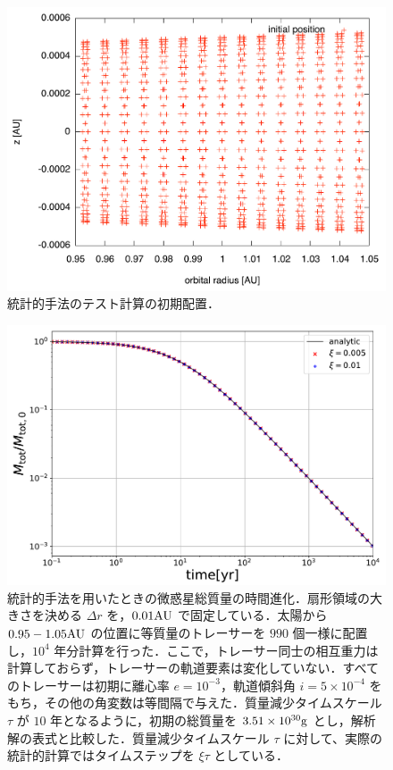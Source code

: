 \documentclass[11pt,a4paper,oneside,onecolumn]{jreport}
\begin{document}
\begin{figure}[H]
 \centering
 \includegraphics[width=12cm]{./image/initial_position_rz.pdf}
 \caption{統計的手法のテスト計算の初期配置．\label{}}
\end{figure}





\begin{figure}[H]
 \centering
 \includegraphics[width=12cm]{./image/MassDepletion.pdf}
 \caption{統計的手法を用いたときの微惑星総質量の時間進化．扇形領域の大きさを決める $\Delta r$ を，$0.01 {\rm AU}$ で固定している．太陽から $0.95 - 1.05 {\rm AU}$ の位置に等質量のトレーサーを $990$ 個一様に配置し，$10^4$ 年分計算を行った．ここで，トレーサー同士の相互重力は計算しておらず，トレーサーの軌道要素は変化していない．すべてのトレーサーは初期に離心率 $e = 10^{-3}$，軌道傾斜角 $i = 5 \times 10^{-4}$ をもち，その他の角変数は等間隔で与えた．質量減少タイムスケール $\tau$ が $10$ 年となるように，初期の総質量を $3.51 \times 10^{30} {\rm g}$ とし，解析解の表式\cite{3}と比較した．質量減少タイムスケール $\tau$ に対して、実際の統計的計算ではタイムステップを $\xi \tau$ としている．\label{}}
\end{figure}
\end{document}
